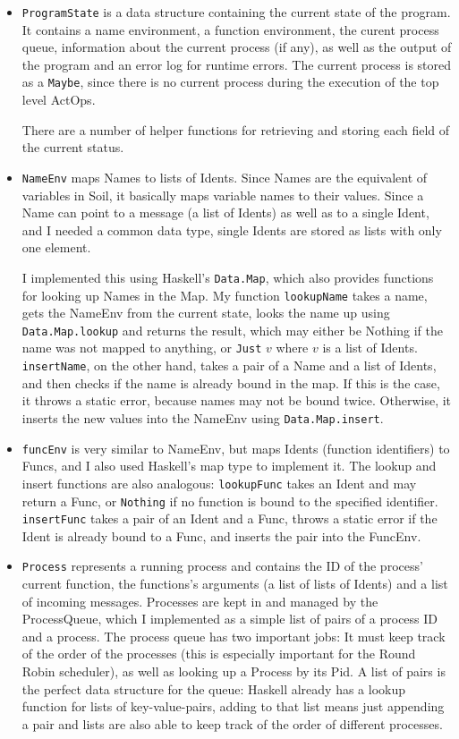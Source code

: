\documentclass[a4paper]{article}
\begin{document}
\begin{itemize}
  \item \texttt{ProgramState} is a data structure containing the current state of the program. It contains a name environment, a function environment, the curent process queue, information about the current process (if any), as well as the output of the program and an error log for runtime errors. The current process is stored as a \texttt{Maybe}, since there is no current process during the execution of the top level ActOps. 
  
  There are a number of helper functions for retrieving and storing each field of the current status.
  \item \texttt{NameEnv} maps Names to lists of Idents. Since Names are the equivalent of variables in Soil, it basically maps variable names to their values. Since a Name can point to a message (a list of Idents) as well as to a single Ident, and I needed a common data type, single Idents are stored as lists with only one element. 
  
  I implemented this using Haskell's \texttt{Data.Map}, which also provides functions for looking up Names in the Map. My function \texttt{lookupName} takes a name, gets the NameEnv from the current state, looks the name up using \texttt{Data.Map.lookup} and returns the result, which may either be Nothing if the name was not mapped to anything, or \texttt{Just} $v$ where $v$ is a list of Idents. \texttt{insertName}, on the other hand, takes a pair of a Name and a list of Idents, and then checks if the name is already bound in the map. If this is the case, it throws a static error, because names may not be bound twice. Otherwise, it inserts the new values into the NameEnv using \texttt{Data.Map.insert}.
  \item \texttt{funcEnv} is very similar to NameEnv, but maps Idents (function identifiers) to Funcs, and I also used Haskell's map type to implement it. The lookup and insert functions are also analogous: \texttt{lookupFunc} takes an Ident and may return a Func, or \texttt{Nothing} if no function is bound to the specified identifier. \texttt{insertFunc} takes a pair of an Ident and a Func, throws a static error if the Ident is already bound to a Func, and inserts the pair into the FuncEnv.
  \item \texttt{Process} represents a running process and contains the ID of the process' current function, the functions's arguments (a list of lists of Idents) and a list of incoming messages. Processes are kept in and managed by the ProcessQueue, which I implemented as a simple list of pairs of a process ID and a process. The process queue has two important jobs: It must keep track of the order of the processes (this is especially important for the Round Robin scheduler), as well as looking up a Process by its Pid. A list of pairs is the perfect data structure for the queue: Haskell already has a lookup function for lists of key-value-pairs, adding to that list means just appending a pair and lists are also able to keep track of the order of different processes.
  

\end{itemize}
\end{document}
